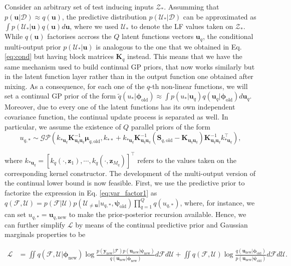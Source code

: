 \documentclass[]{article}
\def\K{{\mathbf K}}
\def\S{{\mathbf S}}
\def\u{{\mathbf u}}
\newcommand{\psiold}{{\bm{\psi}_{\text{old}}}}
\newcommand{\psinew}{{\bm{\psi}_{\text{new}}}}
\newcommand{\unew}{{\u_{\text{new}}}}
\newcommand{\Zcal}{\mathcal{Z}}
\newcommand{\Fcal}{\mathcal{F}}
\newcommand{\Ucal}{\mathcal{U}}
\newcommand{\Dcal}{\mathcal{D}}
\newcommand{\Lcal}{\mathcal{L}}
\newcommand{\yc}{\bm{y}}
\newcommand{\zc}{\bm{z}}
\newcommand{\ycnew}{{\yc_{\text{new}}}}
\newcommand{\phiold}{{\bm{\phi}_{\text{old}}}}
\newcommand{\phinew}{{\bm{\phi}_{\text{new}}}}
\begin{document}
Consider an arbitrary set of test inducing inputs $\Zcal_*$. Assumming that $p(\u|\Dcal) \approx q(\u)$, the predictive distribution $p(\Ucal_*|\Dcal)$ can be approximated as $\int p(\Ucal_*|\u)q(\u)d\u$, where we used $\Ucal_*$ to denote the LF values taken on $\Zcal_*$. While $q(\u)$ factorises accross the $Q$ latent functions vectors $\u_q$, the conditional multi-output prior $p(\Ucal_*|\u)$ is analogous to the one that we obtained in Eq. \eqref{eq:cond} but having block matrices $\K_q$ instead. This means that we have the same mechanism used to build continual GP priors, that now works similarly but in the latent function layer rather than in the output function one obtained after mixing. As a consequence, for each one of the $q$-th non-linear functions, we will set a continual GP prior of the form $\widetilde{q}(u_*|\phiold) \approx \int p(u_{*}|\u_q) q(\u_q|\phiold)d\u_q$.  Moreover, due to every one of the latent functions has its own independent covariance function, the continual update process is separated as well. In particular, we assume the existence of $Q$ parallel priors of the form
\begin{equation}
\label{eq:mogp_continual_prior}
u_{q,*} \sim \mathcal{GP}(k_{*\u_q}\K^{-1}_{\u_q\u_q}\bm{\mu}_{q,\text{old}}, k_{**} + k_{*\u_q}\K^{-1}_{\u_q\u_q}(\S_{q,\text{old}} - \K_{\u_q\u_q})\K^{-1}_{\u_q\u_q}k^\top_{*\u_q}),
\end{equation}

where $k_{*\u_q} = [k_q(\cdot, \zc_1), \cdots, k_q(\cdot, \zc_{M_q})]^\top$ refers to the values taken on the corresponding kernel constructor. The development of the multi-output version of the continual lower bound is now feasible. First, we use the predictive prior to factorize the expression in Eq. \eqref{eq:var_factor1} as $q(\Fcal, \Ucal) = p(\Fcal|\Ucal)p(\Ucal_{\neq \u}|u_{q,*}, \psiold)\prod_{q=1}^{Q}q(u_{q,*})$, where, for instance, we can set $u_{q,*} = \u_{q,\text{new}}$ to make the prior-posterior recursion available. Hence, we can further simplify $\Lcal$ by means of the continual predictive prior and Gaussian marginals properties to be

\begin{align}
\Lcal &= \iint q(\Fcal, \Ucal|\phinew) \log \frac{p(\ycnew|\Fcal)p(\unew|\psinew)}{q(\unew|\phinew)}d\Fcal d\Ucal  + \iint q(\Fcal, \Ucal) \log \frac{q(\unew|\phiold)}{p(\unew|\psiold)}d\Fcal d\Ucal.
\end{align}
\end{document}
